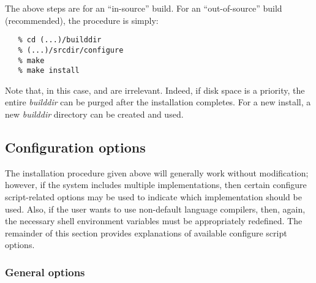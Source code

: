 The above steps are for an ``in-source'' build. For an ``out-of-source'' build (recommended),
the procedure is simply:
\begin{verbatim}
   % cd (...)/builddir
   % (...)/srcdir/configure
   % make
   % make install
\end{verbatim}
Note that, in this case,  and  are
irrelevant. Indeed, if disk space is a priority, the entire {\em
builddir} can be purged after the installation completes. For a new
install, a new {\em builddir} directory can be created and used.


\subsection{Configuration options}\label{ss:configuration_options}

The installation procedure given above will generally work without modification;
however, if the system includes multiple {\mpi} implementations, then certain
configure script-related options may be used to indicate which {\mpi}
implementation should be used. Also, if the user wants to use non-default
language compilers, then, again, the necessary shell environment variables must
be appropriately redefined.
The remainder of this section provides explanations of available configure script
options.


\subsubsection*{General options}



